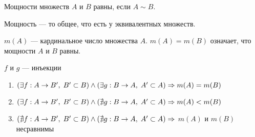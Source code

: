 \documentclass{article}
\begin{document}

Мощности множеств $A$ и $B$ равны, если $A\sim B$.

Мощность --- то общее, что есть у эквивалентных множеств.

$m(A)$ --- кардинальное число множества $A$.
$m(A)=m(B)$ означает, что мощности $A$ и $B$ равны.


$f$ и $g$ --- инъекции
\begin{enumerate}
	\item{}$(\exists f:A\to B',\;B'\subset B)\land(\exists g:B\to A,\;A'\subset A)\Rightarrow m(A)=m(B)$
	\item{}$(\exists f:A\to B',\;B'\subset B)\land(\nexists g:B\to A,\;A'\subset A)\Rightarrow m(A)<m(B)$
	\item{}$(\nexists f:A\to B',\;B'\subset B)\land(\nexists g:B\to A,\;A'\subset A)\Rightarrow$ $m(A)$ и $m(B)$ несравнимы
\end{enumerate}
\end{document}
